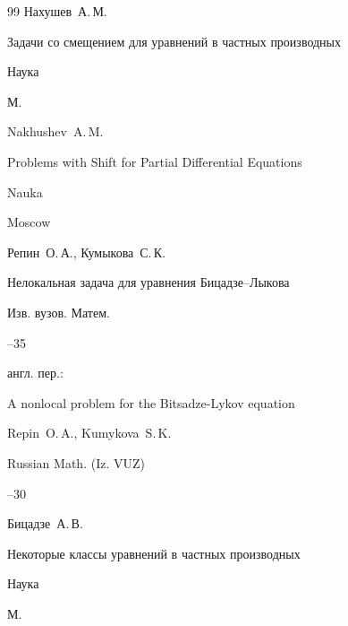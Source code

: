 \begin{thebibliography}{99}
\by Нахушев~А.\,М.

\book Задачи со смещением для уравнений в частных производных

\publ Наука

\publaddr М.



\misctransl

\by Nakhushev~A.\,M.

\book Problems with Shift for Partial Differential Equations

\publ Nauka

\publaddr Moscow






\by Репин~О.\,А., Кумыкова~С.\,К.

\paper Нелокальная задача для уравнения Бицадзе--Лыкова

\jour Изв. вузов. Матем.



--35



\transl англ. пер.:~

\paper A nonlocal problem for the Bitsadze-Lykov equation

\by Repin~O.\,A., Kumykova~S.\,K.

\jour Russian Math. (Iz. VUZ)




--30







\by Бицадзе~А.\,В.

\book Некоторые классы уравнений в частных производных

\publ Наука

\publaddr М.




\end{thebibliography}
